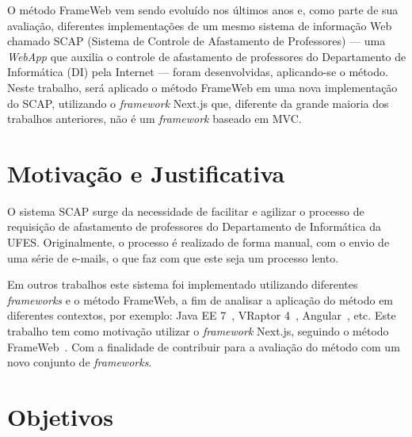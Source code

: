 O método FrameWeb vem sendo evoluído nos últimos anos e, como parte de sua avaliação, diferentes implementações de um mesmo sistema de informação Web chamado SCAP (Sistema de Controle de Afastamento de Professores) --- uma \textit{WebApp} que auxilia o controle de afastamento de professores do Departamento de Informática (DI) pela Internet --- foram desenvolvidas, aplicando-se o método. 
Neste trabalho, será aplicado o método FrameWeb em uma nova implementação do SCAP, 
utilizando o \textit{framework} Next.js que, diferente da grande maioria dos trabalhos anteriores, 
não é um \textit{framework} baseado em MVC.


\section{Motivação e Justificativa}
\label{sec-intro-motjus}

O sistema SCAP surge da necessidade de facilitar e agilizar o processo de requisição de afastamento de 
professores do Departamento de Informática da UFES. Originalmente, o processo é realizado 
de forma manual, com o envio de uma série de e-mails, o que faz com que este seja um processo lento.


Em outros trabalhos este sistema foi implementado utilizando diferentes \textit{frameworks} e o método FrameWeb, a fim de analisar a aplicação do método em diferentes contextos, por exemplo: Java EE 7~\cite{duarte:2014}, VRaptor 4~\cite{prado:2015}, Angular~\cite{gomes:2022}, etc. 
Este trabalho tem como motivação utilizar o \textit{framework} Next.js, seguindo o método FrameWeb~\cite{souza:2007}. Com a finalidade de contribuir para a avaliação do método com um novo conjunto de \textit{frameworks}.


\section{Objetivos}
\label{sec-intro-obj}

